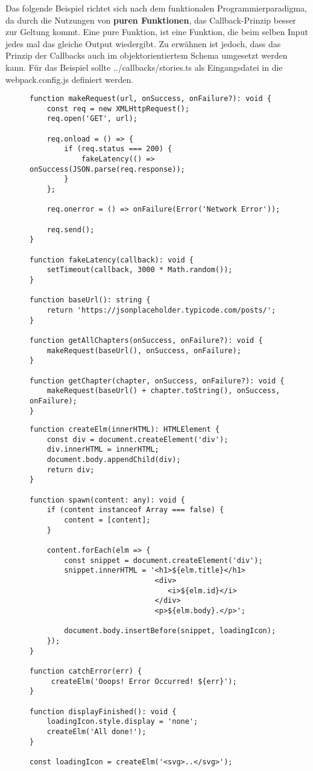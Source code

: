 \noindent
Das folgende Beispiel richtet sich nach dem funktionalen Programmierparadigma, da durch die Nutzungen von \textbf{puren Funktionen}, das Callback-Prinzip besser zur Geltung kommt. Eine pure Funktion, ist eine Funktion, die beim selben Input jedes mal das gleiche Output wiedergibt. Zu erwähnen ist jedoch, dass das Prinzip der Callbacks auch im objektorientiertem Schema umgesetzt werden kann. Für das Beispiel sollte ../callbacks/stories.ts als Eingangsdatei in die webpack.config.js definiert werden.

\begin{figure}[H]
\begin{lstlisting}[basicstyle=\small]
function makeRequest(url, onSuccess, onFailure?): void {
    const req = new XMLHttpRequest();
    req.open('GET', url);

    req.onload = () => {
        if (req.status === 200) {
            fakeLatency(() => onSuccess(JSON.parse(req.response));
        }
    };

    req.onerror = () => onFailure(Error('Network Error'));

    req.send();
}

function fakeLatency(callback): void {
    setTimeout(callback, 3000 * Math.random());
}

function baseUrl(): string {
    return 'https://jsonplaceholder.typicode.com/posts/';
}

function getAllChapters(onSuccess, onFailure?): void {
    makeRequest(baseUrl(), onSuccess, onFailure);
}

function getChapter(chapter, onSuccess, onFailure?): void {
    makeRequest(baseUrl() + chapter.toString(), onSuccess, onFailure);
}
\end{lstlisting}
\end{figure}

\begin{figure}[H]
\begin{lstlisting}[basicstyle=\small]
function createElm(innerHTML): HTMLElement {
    const div = document.createElement('div');
    div.innerHTML = innerHTML;
    document.body.appendChild(div);
    return div;
}

function spawn(content: any): void {
    if (content instanceof Array === false) {
        content = [content];
    }

    content.forEach(elm => {
        const snippet = document.createElement('div');
        snippet.innerHTML = '<h1>${elm.title}</h1>
                             <div>
                                <i>${elm.id}</i>
                             </div>
                             <p>${elm.body}.</p>';

        document.body.insertBefore(snippet, loadingIcon);
    });
}

function catchError(err) {
     createElm('Ooops! Error Occurred! ${err}');
}

function displayFinished(): void {
    loadingIcon.style.display = 'none';
    createElm('All done!');
}

const loadingIcon = createElm('<svg>..</svg>');
\end{lstlisting}
\end{figure}

